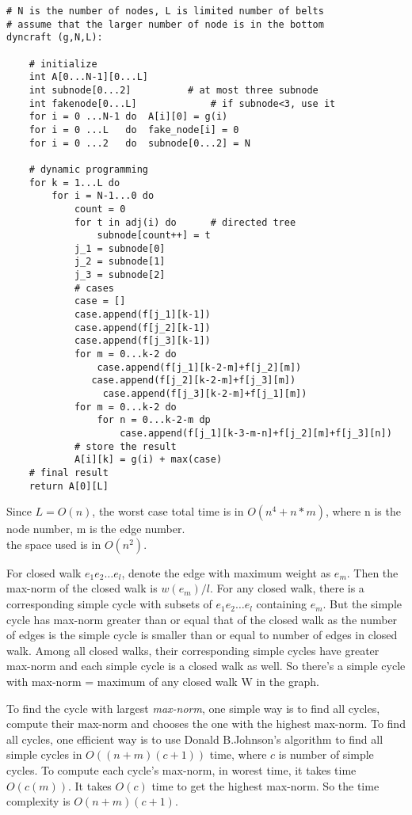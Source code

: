 \documentclass[12pt,a4paper]{article}
\newcommand{\question}[1]{\bigskip\noindent{\textbf{Q{#1} solution}}}
\begin{document}
\begin{lstlisting}
# N is the number of nodes, L is limited number of belts
# assume that the larger number of node is in the bottom
dyncraft (g,N,L):  

	# initialize
	int A[0...N-1][0...L]
	int subnode[0...2]  		# at most three subnode
	int fakenode[0...L] 			# if subnode<3, use it
	for i = 0 ...N-1 do  A[i][0] = g(i)
	for i = 0 ...L 	 do  fake_node[i] = 0
	for i = 0 ...2 	 do  subnode[0...2] = N
	
	# dynamic programming
	for k = 1...L do
	    for i = N-1...0 do
	        count = 0
	        for t in adj(i) do  	# directed tree
	            subnode[count++] = t
	        j_1 = subnode[0]
	        j_2 = subnode[1]
	        j_3 = subnode[2]
	        # cases
	        case = []
	        case.append(f[j_1][k-1])
	        case.append(f[j_2][k-1])
	        case.append(f[j_3][k-1])
	        for m = 0...k-2 do
	            case.append(f[j_1][k-2-m]+f[j_2][m]) 
		   	   case.append(f[j_2][k-2-m]+f[j_3][m])
		         case.append(f[j_3][k-2-m]+f[j_1][m])
	        for m = 0...k-2 do
	            for n = 0...k-2-m dp
		            case.append(f[j_1][k-3-m-n]+f[j_2][m]+f[j_3][n])
	        # store the result
	        A[i][k] = g(i) + max(case)
	# final result
	return A[0][L]

\end{lstlisting}
Since $L = O(n)$, the worst case total time is in $O(n^4 + n*m)$, where n is the node number, m is the edge number.\\
the space used is in $O(n^2)$.\\


\question{27.A}

For closed walk $e_1e_2\dots e_l$, denote the edge with maximum weight as $e_m$. Then the max-norm of the closed walk is $w(e_m)/l$. For any closed walk, there is a corresponding simple cycle with subsets of $e_1e_2\dots e_l$ containing $e_m$. But the simple cycle has max-norm greater than or equal that of the closed walk as the number of edges is the simple cycle is smaller than or equal to number of edges in closed walk. Among all closed walks, their corresponding simple cycles have greater max-norm and each simple cycle is a closed walk as well. So there's a simple cycle with max-norm = maximum of any closed walk W in the graph.

\question{27.B}

To find the cycle with largest {\em max-norm}, one simple way is to find all cycles, compute their max-norm and chooses the one with the highest max-norm. To find all cycles, one efficient way is to use Donald B.Johnson's algorithm to find all simple cycles in $O((n + m)(c + 1))$ time, where $c$ is number of simple cycles\cite{doi:10.1137/0204007}. To compute each cycle's max-norm, in worest time, it takes time $O(c(m))$. It takes $O(c)$ time to get the highest max-norm. So the time complexity is $O(n + m)(c + 1)$.



\end{document}
